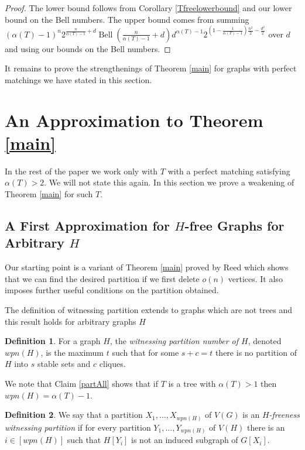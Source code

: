 \documentclass[12pt]{article}
\theoremstyle{definition}
\newtheorem*{definition}{Definition}
\DeclareMathOperator{\Bell}{Bell}
\begin{document}
\begin{proof}
The lower bound follows from Corollary \ref{Tfreelowerbound} and our lower bound on the Bell numbers. 
The upper bound comes from summing $(\alpha(T)-1)^n2^{\frac{n}{\alpha(T)-1}+d}\Bell(\frac{n}{\alpha(T)-1}+d)d^{\alpha(T)-1}2^{(1-\frac{1}{\alpha(T)-1})\frac{n^2}{2}-\frac{d^2}{2}}$
over $d$ and using our bounds on the Bell numbers. 

\end{proof}

It remains to prove the strengthenings of Theorem \ref{main} for graphs with perfect matchings we have stated 
in this section. 


\section{An Approximation to Theorem \ref{main}} \label{structure}

In the rest of the paper we work only with $T$ with  a perfect matching satisfying $\alpha (T)>2$. We will not state this again.
In this section  we prove  a weakening of Theorem \ref{main} for  such $T$. 



\subsection{A First Approximation  for $H$-free Graphs for Arbitrary $H$}

Our starting point is a variant  of Theorem \ref{main} proved by Reed 
which shows that we can find the desired partition if we first delete $o(n)$ vertices. 
It  also  imposes further useful   conditions on the partition obtained.



The definition of witnessing partition extends to graphs which are not trees
and this result holds for arbitrary graphs $H$

\begin{definition}
For a graph $H$, the {\it witnessing partition number of $H$}, denoted $wpn(H)$, is the maximum $t$ such that for some $s+c=t$ there is no partition of $H$ into $s$ stable sets and $c$ cliques.
\end{definition}

We note that Claim \ref{partAll} shows that if $T$ is a tree
with $\alpha(T)>1$  then $wpn(H)=\alpha(T)-1$.


\begin{definition}
We say that a partition  $X_1,\ldots,X_{wpn(H)}$ of $V(G)$ is an {\it $H$-freeness witnessing partition} if for every  partition $Y_1,\ldots,Y_{wpn(H)}$ of $V(H)$ there is an $i\in [wpn(H)]$ such that $H[Y_i]$ is not an induced subgraph of $G[X_i]$. 
\end{definition}
\end{document}
